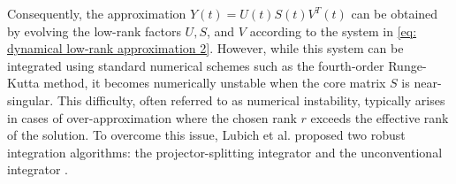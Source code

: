 \documentclass[preprint,11pt]{elsarticle}
\begin{document}
Consequently, the approximation $Y(t)=U(t)S(t)V^T(t)$ can be obtained by evolving the low-rank factors $U, S$, and $V$ according to the system in \cref{eq: dynamical low-rank approximation 2}. However, while this system can be integrated using standard numerical schemes such as the fourth-order Runge-Kutta method, it becomes numerically unstable when the core matrix $S$ is near-singular. This difficulty, often referred to as numerical instability, typically arises in cases of over-approximation where the chosen rank $r$ exceeds the effective rank of the solution. To overcome this issue, Lubich et al. proposed two robust integration algorithms: the projector-splitting integrator \cite{lubichProjectorsplittingIntegratorDynamical2014} and the unconventional integrator \cite{cerutiUnconventionalRobustIntegrator2022}.
\end{document}
